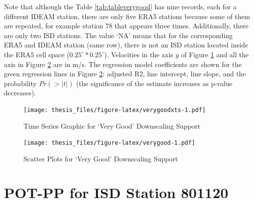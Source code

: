 \documentclass[12pt,twoside]{reedthesis}
\begin{document}
Note that although the Table \ref{tab:tableverygood} has nine records, each for a different IDEAM station, there are only five ERA5 stations because some of them are repeated, for example station 78 that appears three times. Additionally, there are only two ISD stations. The value `NA' means that for the corresponding ERA5 and IDEAM station (same row), there is not an ISD station located inside the ERA5 cell space (\(0.25^\circ * 0.25^\circ\)). Velocities in the axis \(y\) of Figure \ref{fig:verygoodxts} and all the axis in Figure \ref{fig:verygood} are in m/s. The regression model coefficients are shown for the green regression lines in Figure \ref{fig:verygood}: adjusted R2, line intercept, line slope, and the probability \(Pr(>|t|)\) (the significance of the estimate increases as p-value decreases).
\begin{figure}
\centering
\texttt{[image: thesis\_files/figure-latex/verygoodxts-1.pdf]}
\caption{\label{fig:verygoodxts}Time Series Graphic for `Very Good' Downscaling Support}
\end{figure}
\begin{figure}
\centering
\texttt{[image: thesis\_files/figure-latex/verygood-1.pdf]}
\caption{\label{fig:verygood}Scatter Plots for `Very Good' Downscaling Support}
\end{figure}
\hypertarget{pot-pp-for-isd-station-801120}{%
\section{POT-PP for ISD Station 801120}\label{pot-pp-for-isd-station-801120}}
\end{document}
